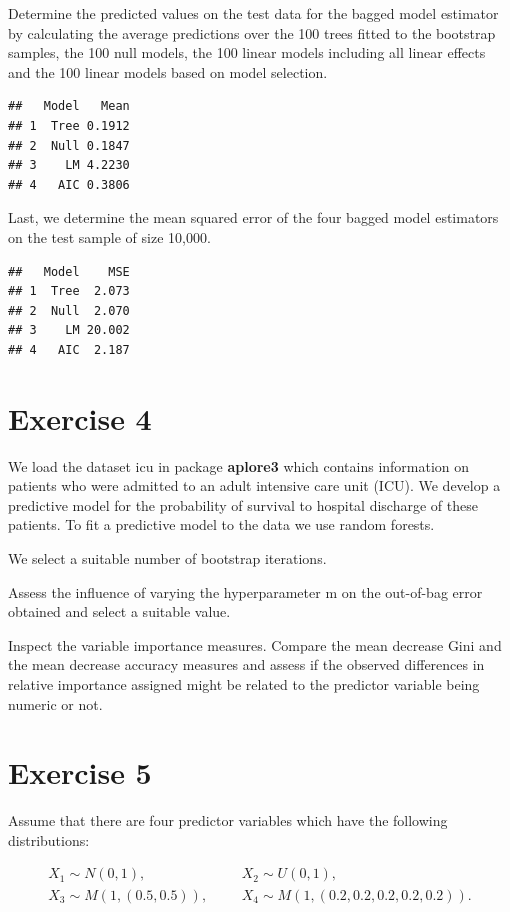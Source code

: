 \documentclass[
]{article}
\begin{document}
Determine the predicted values on the test data for the bagged model
estimator by calculating the average predictions over the 100 trees
fitted to the bootstrap samples, the 100 null models, the 100 linear
models including all linear effects and the 100 linear models based on
model selection.

\begin{verbatim}
##   Model   Mean
## 1  Tree 0.1912
## 2  Null 0.1847
## 3    LM 4.2230
## 4   AIC 0.3806
\end{verbatim}

Last, we determine the mean squared error of the four bagged model
estimators on the test sample of size 10,000.

\begin{verbatim}
##   Model    MSE
## 1  Tree  2.073
## 2  Null  2.070
## 3    LM 20.002
## 4   AIC  2.187
\end{verbatim}

\section{Exercise 4}\label{exercise-4}

We load the dataset icu in package \textbf{aplore3} which contains
information on patients who were admitted to an adult intensive care
unit (ICU). We develop a predictive model for the probability of
survival to hospital discharge of these patients. To fit a predictive
model to the data we use random forests.

We select a suitable number of bootstrap iterations.

Assess the influence of varying the hyperparameter m on the out-of-bag
error obtained and select a suitable value.

Inspect the variable importance measures. Compare the mean decrease Gini
and the mean decrease accuracy measures and assess if the observed
differences in relative importance assigned might be related to the
predictor variable being numeric or not.

\section{Exercise 5}\label{exercise-5}

Assume that there are four predictor variables which have the following
distributions:

\begin{align}
X_1 \sim N(0, 1),&& &X_2 \sim U(0, 1), \\
X_3 \sim M(1, (0.5, 0.5)),&& &X_4 \sim M(1, (0.2, 0.2, 0.2, 0.2, 0.2)).
\end{align}
\end{document}
